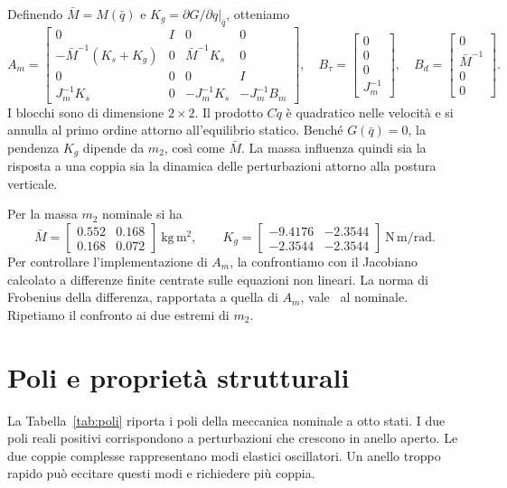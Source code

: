 Definendo $\bar M=M(\bar q)$ e $K_g=\partial G/\partial q|_{\bar q}$,
otteniamo
\[
 A_m=\begin{bmatrix}
 0&I&0&0\\
 -\bar M^{-1}(K_s+K_g)&0&\bar M^{-1}K_s&0\\
 0&0&0&I\\
 J_m^{-1}K_s&0&-J_m^{-1}K_s&-J_m^{-1}B_m
 \end{bmatrix},
\quad B_\tau=\begin{bmatrix}0\\0\\0\\J_m^{-1}\end{bmatrix},
\quad B_d=\begin{bmatrix}0\\\bar M^{-1}\\0\\0\end{bmatrix}.
\]
I blocchi sono di dimensione $2\times2$. Il prodotto $C\dot q$ è
quadratico nelle velocità e si annulla al primo ordine attorno
all'equilibrio statico. Benché $G(\bar q)=0$, la pendenza $K_g$
dipende da $m_2$, così come $\bar M$. La massa influenza quindi
sia la risposta a una coppia sia la dinamica delle perturbazioni
attorno alla postura verticale.

Per la massa $m_2$ nominale si ha
\[
 \bar M=\begin{bmatrix}0.552&0.168\\0.168&0.072\end{bmatrix}\ \mathrm{kg\,m^2},\qquad
 K_g=\begin{bmatrix}-9.4176&-2.3544\\-2.3544&-2.3544\end{bmatrix}\ \mathrm{N\,m/rad}.
\]
Per controllare l'implementazione di $A_m$, la confrontiamo con il
Jacobiano calcolato a differenze finite centrate sulle equazioni
non lineari. La norma di Frobenius della differenza, rapportata a
quella di $A_m$, vale \FinErroreJacobiano\ al nominale. Ripetiamo
il confronto ai due estremi di $m_2$.

\section{Poli e proprietà strutturali}
La Tabella~\ref{tab:poli} riporta i poli della meccanica nominale a
otto stati. I due poli reali positivi corrispondono a perturbazioni
che crescono in anello aperto. Le due coppie complesse rappresentano
modi elastici oscillatori. Un anello troppo rapido può eccitare
questi modi e richiedere più coppia.

